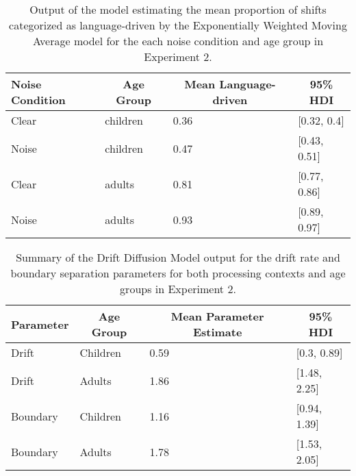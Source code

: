 \documentclass[,man,floatsintext]{apa6}
\begin{document}
\begin{appendix}
\begin{table}[h]
\begin{center}
\begin{threeparttable}
\caption{\label{tab:noise-guess-cuts}Output of the model estimating the mean proportion of shifts categorized as language-driven by the Exponentially Weighted Moving Average model for the each noise condition and age group in Experiment 2.}
\begin{tabular}{llll}
\toprule
Noise Condition & \multicolumn{1}{c}{Age Group} & \multicolumn{1}{c}{Mean Language-driven} & \multicolumn{1}{c}{95\% HDI}\\
\midrule
Clear & children & 0.36 & [0.32, 0.4]\\
Noise & children & 0.47 & [0.43, 0.51]\\
Clear & adults & 0.81 & [0.77, 0.86]\\
Noise & adults & 0.93 & [0.89, 0.97]\\
\bottomrule
\end{tabular}
\end{threeparttable}
\end{center}
\end{table}

\begin{table}[h]
\begin{center}
\begin{threeparttable}
\caption{\label{tab:noise-hddm}Summary of the Drift Diffusion Model output for the drift rate and boundary separation parameters for both processing contexts and age groups in Experiment 2.}
\begin{tabular}{llll}
\toprule
Parameter & \multicolumn{1}{c}{Age Group} & \multicolumn{1}{c}{Mean Parameter Estimate} & \multicolumn{1}{c}{95\% HDI}\\
\midrule
Drift & Children & 0.59 & [0.3, 0.89]\\
Drift & Adults & 1.86 & [1.48, 2.25]\\
Boundary & Children & 1.16 & [0.94, 1.39]\\
Boundary & Adults & 1.78 & [1.53, 2.05]\\
\bottomrule
\end{tabular}
\end{threeparttable}
\end{center}
\end{table}
\end{appendix}
\end{document}
